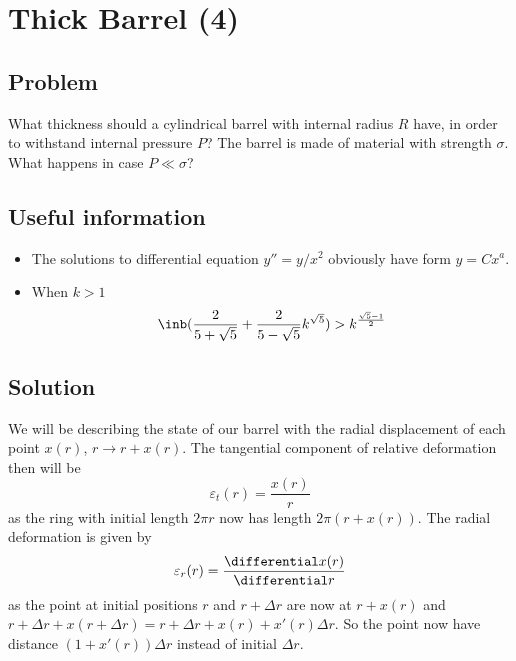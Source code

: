 \section*{Thick Barrel (4)}

\subsection*{Problem}
What thickness should a cylindrical barrel with internal radius $R$ have,
in order to withstand internal pressure $P$?
The barrel is made of material with strength $\sigma$.
What happens in case $P \ll \sigma$?

\subsection*{Useful information}
\begin{itemize}
    \item The solutions to differential equation $y'' = y / x^2$
        obviously have form $y = C x^a$.
    \item When $k>1$
        \begin{equation*}
            \inb({\frac{2}{5 + \sqrt{5}} + \frac{2}{5 - \sqrt{5}} k^{\sqrt{5}}}) > k^{\frac{\sqrt{5} - 1}{2}}
        \end{equation*}
\end{itemize}

\subsection*{Solution}

We will be describing the state of our barrel
with the radial displacement of each point $x(r)$,
$r \rightarrow r + x(r)$.
The tangential component of relative deformation then will be
\begin{equation}
    \varepsilon_t(r) = \frac{x(r)}{r}
\end{equation}
as the ring with initial length $2\pi r$ now has length $2\pi (r + x(r))$.
The radial deformation is given by
\begin{equation}
    \varepsilon_r(r) = \frac{\differential x(r)}{\differential r}
\end{equation}
as the point at initial positions $r$ and $r + \Delta r$ are now at
$r + x(r)$ and $r + \Delta r + x(r + \Delta r) = r + \Delta r + x(r) + x'(r) \Delta r$.
So the point now have distance $(1 + x'(r)) \Delta r$ instead of initial $\Delta r$.


